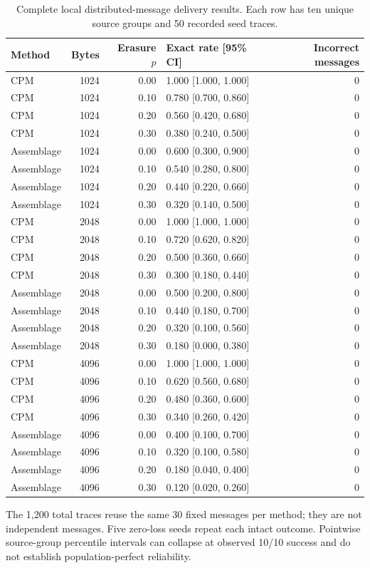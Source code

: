 \documentclass[journal]{IEEEtran}
\renewcommand{\arraystretch}{1.2}
\renewcommand{\arraystretch}{1.0}
\theoremstyle{definition}
\theoremstyle{game}
\renewcommand{\arraystretch}{1.5}
\begin{document}
\begin{table}[!t]
\centering\small
\caption{Complete local distributed-message delivery results. Each row has ten unique source groups and 50 recorded seed traces.}
\label{tab:native-delivery}
\setlength{\tabcolsep}{4pt}\renewcommand{\arraystretch}{1.12}
\begin{tabular}{lrrlr}
\toprule
Method & Bytes & Erasure $p$ & Exact rate [95\% CI] & Incorrect messages\\
\midrule
CPM & 1024 & 0.00 & 1.000 [1.000, 1.000] & 0\\
CPM & 1024 & 0.10 & 0.780 [0.700, 0.860] & 0\\
CPM & 1024 & 0.20 & 0.560 [0.420, 0.680] & 0\\
CPM & 1024 & 0.30 & 0.380 [0.240, 0.500] & 0\\
Assemblage & 1024 & 0.00 & 0.600 [0.300, 0.900] & 0\\
Assemblage & 1024 & 0.10 & 0.540 [0.280, 0.800] & 0\\
Assemblage & 1024 & 0.20 & 0.440 [0.220, 0.660] & 0\\
Assemblage & 1024 & 0.30 & 0.320 [0.140, 0.500] & 0\\
CPM & 2048 & 0.00 & 1.000 [1.000, 1.000] & 0\\
CPM & 2048 & 0.10 & 0.720 [0.620, 0.820] & 0\\
CPM & 2048 & 0.20 & 0.500 [0.360, 0.660] & 0\\
CPM & 2048 & 0.30 & 0.300 [0.180, 0.440] & 0\\
Assemblage & 2048 & 0.00 & 0.500 [0.200, 0.800] & 0\\
Assemblage & 2048 & 0.10 & 0.440 [0.180, 0.700] & 0\\
Assemblage & 2048 & 0.20 & 0.320 [0.100, 0.560] & 0\\
Assemblage & 2048 & 0.30 & 0.180 [0.000, 0.380] & 0\\
CPM & 4096 & 0.00 & 1.000 [1.000, 1.000] & 0\\
CPM & 4096 & 0.10 & 0.620 [0.560, 0.680] & 0\\
CPM & 4096 & 0.20 & 0.480 [0.360, 0.600] & 0\\
CPM & 4096 & 0.30 & 0.340 [0.260, 0.420] & 0\\
Assemblage & 4096 & 0.00 & 0.400 [0.100, 0.700] & 0\\
Assemblage & 4096 & 0.10 & 0.320 [0.100, 0.580] & 0\\
Assemblage & 4096 & 0.20 & 0.180 [0.040, 0.400] & 0\\
Assemblage & 4096 & 0.30 & 0.120 [0.020, 0.260] & 0\\
\bottomrule
\end{tabular}
\par\smallskip\parbox{.97\textwidth}{\footnotesize The 1,200 total traces reuse the same 30 fixed messages per method; they are not independent messages. Five zero-loss seeds repeat each intact outcome. Pointwise source-group percentile intervals can collapse at observed 10/10 success and do not establish population-perfect reliability.}
\end{table}
\end{document}
